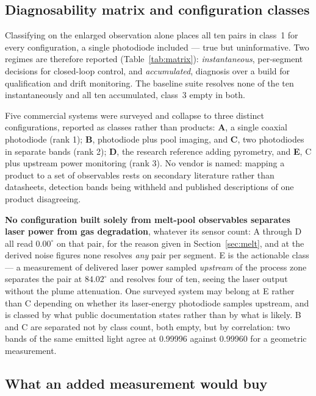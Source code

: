\documentclass[preprint,times]{elsarticle}
\begin{document}
\subsection{Diagnosability matrix and configuration classes}

Classifying on the enlarged observation alone places all ten pairs in class~1 for
every configuration, a single photodiode included --- true but uninformative. Two
regimes are therefore reported (Table~\ref{tab:matrix}): \emph{instantaneous},
per-segment decisions for closed-loop control, and \emph{accumulated}, diagnosis
over a build for qualification and drift monitoring. The baseline suite resolves none of the ten instantaneously and all ten
accumulated, class~3 empty in both.

Five commercial systems were surveyed and collapse to three distinct
configurations, reported as classes rather than products: \textbf{A}, a single
coaxial photodiode (rank 1); \textbf{B}, photodiode plus pool imaging, and
\textbf{C}, two photodiodes in separate bands (rank 2); \textbf{D}, the research
reference adding pyrometry, and \textbf{E}, C plus upstream power monitoring
(rank 3). No vendor is named: mapping a product to a set of observables rests on
secondary literature rather than datasheets, detection bands being withheld and
published descriptions of one product disagreeing.

\textbf{No configuration built solely from melt-pool observables separates laser
power from gas degradation}, whatever its sensor count: A through D all read
$0.00^\circ$ on that pair, for the reason given in Section~\ref{sec:melt}, and at
the derived noise figures none resolves \emph{any} pair per segment. E is the
actionable class --- a measurement of delivered laser power sampled
\emph{upstream} of the process zone separates the pair at $84.02^\circ$ and
resolves four of ten, seeing the laser output without the plume attenuation. One
surveyed system may belong at E rather than C depending on whether its
laser-energy photodiode samples upstream, and is classed by what public
documentation states rather than by what is likely. B and C are separated not by
class count, both empty, but by correlation: two bands of the same emitted light
agree at 0.99996 against 0.99960 for a geometric measurement.

\subsection{What an added measurement would buy}
\label{sec:added}
\end{document}
